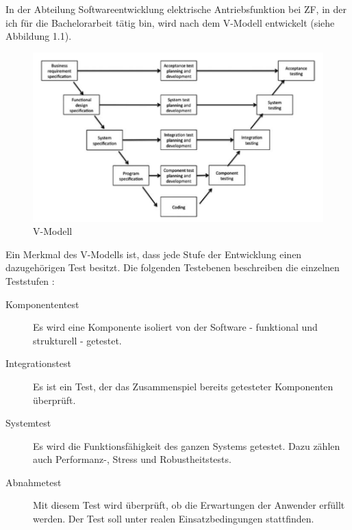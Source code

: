 In der Abteilung Softwareentwicklung elektrische Antriebsfunktion bei ZF, in der ich für die Bachelorarbeit tätig bin,
wird nach dem V-Modell entwickelt (siehe Abbildung 1.1).\par
\begin{figure}[h]
\centering
\includegraphics[scale=1.2,]{Bilder/VModell.png}
\caption{V-Modell \parencite[S. 68]{agiletesting}}\label{fig:VModell}
\end{figure}
Ein Merkmal des V-Modells ist, dass jede Stufe der Entwicklung einen dazugehörigen Test besitzt.
Die folgenden Testebenen beschreiben die einzelnen Teststufen \parencite[S. 41 f., S. 51]{integration}:
\begin{description}
\item[Komponententest] Es wird eine Komponente isoliert von der Software - funktional und strukturell - getestet. %
\item[Integrationstest] Es ist ein Test, der das Zusammenspiel bereits getesteter Komponenten überprüft. %
\item[Systemtest] Es wird die Funktionsfähigkeit des ganzen Systems getestet. Dazu zählen auch Performanz-, Stress und Robustheitstests.
\item[Abnahmetest] Mit diesem Test wird überprüft, ob die Erwartungen der Anwender erfüllt werden. Der Test soll
unter realen Einsatzbedingungen stattfinden.
\end{description}
